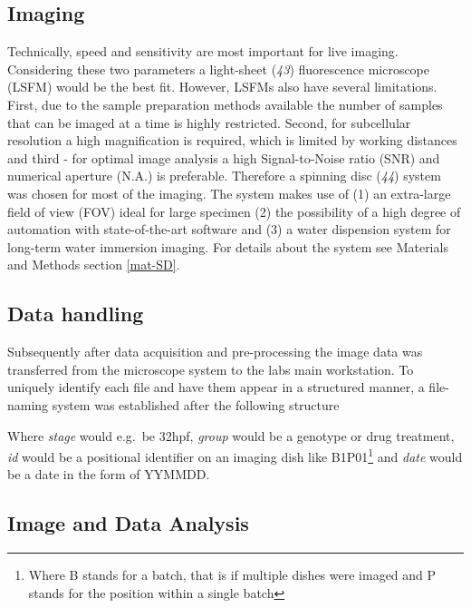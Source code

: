 \documentclass[11pt,singlespacinge,twoside]{reedthesis} %
\begin{document}
\hypertarget{imaging}{%
\subsection{Imaging}\label{imaging}}

Technically, speed and sensitivity are most important for live imaging. Considering these two parameters a light-sheet (\emph{43}) fluorescence microscope (LSFM) would be the best fit. However, LSFMs also have several limitations. First, due to the sample preparation methods available the number of samples that can be imaged at a time is highly restricted. Second, for subcellular resolution a high magnification is required, which is limited by working distances and third - for optimal image analysis a high Signal-to-Noise ratio (SNR) and numerical aperture (N.A.) is preferable. Therefore a spinning disc (\emph{44}) system was chosen for most of the imaging.
The system makes use of (1) an extra-large field of view (FOV) ideal for large specimen (2) the possibility of a high degree of automation with state-of-the-art software and (3) a water dispension system for long-term water immersion imaging. For details about the system see Materials and Methods section \ref{mat-SD}.

\hypertarget{data-handling}{%
\subsection{Data handling}\label{data-handling}}

Subsequently after data acquisition and pre-processing the image data was transferred from the microscope system to the labs main workstation. To uniquely identify each file and have them appear in a structured manner, a file-naming system was established after the following structure

\makebox[\linewidth]{$[stage]\_[group]\_[id]\_[date]$}
\newline

Where \emph{stage} would e.g.~be 32hpf, \emph{group} would be a genotype or drug treatment, \emph{id} would be a positional identifier on an imaging dish like B1P01\footnote{Where B stands for a batch, that is if multiple dishes were imaged and P stands for the position within a single batch} and \emph{date} would be a date in the form of YYMMDD.

\hypertarget{image-and-data-analysis}{%
\subsection{Image and Data Analysis}\label{image-and-data-analysis}}
\end{document}
